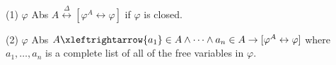 (1) $\varphi$ Abs $A \overset{\Delta}{\leftrightarrow} [\varphi^A \leftrightarrow \varphi]$ if $\varphi$ is closed.

(2) $\varphi$ Abs $A \xleftrightarrow{a_1} \in A \wedge \cdots \wedge a_n \in A \rightarrow [\varphi^A \leftrightarrow \varphi]$ where $a_1, \ldots, a_n$ is a complete list of all of the free variables in $\varphi$.
